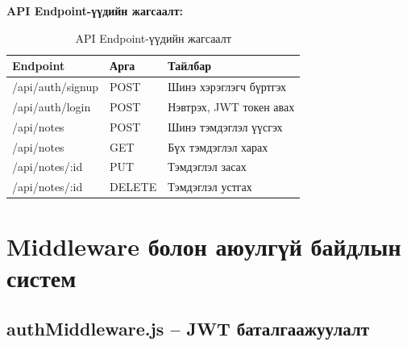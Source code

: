 \textbf{API Endpoint-үүдийн жагсаалт:}

\begin{longtable}{|p{4cm}|p{2cm}|p{7cm}|}
\caption{API Endpoint-үүдийн жагсаалт}\\
\hline
\textbf{Endpoint} & \textbf{Арга} & \textbf{Тайлбар} \\
\hline
/api/auth/signup & POST & Шинэ хэрэглэгч бүртгэх \\
\hline
/api/auth/login & POST & Нэвтрэх, JWT токен авах \\
\hline
/api/notes & POST & Шинэ тэмдэглэл үүсгэх \\
\hline
/api/notes & GET & Бүх тэмдэглэл харах \\
\hline
/api/notes/:id & PUT & Тэмдэглэл засах \\
\hline
/api/notes/:id & DELETE & Тэмдэглэл устгах \\
\hline
\end{longtable}

\section{Middleware болон аюулгүй байдлын систем}

\subsection{authMiddleware.js -- JWT баталгаажуулалт}

